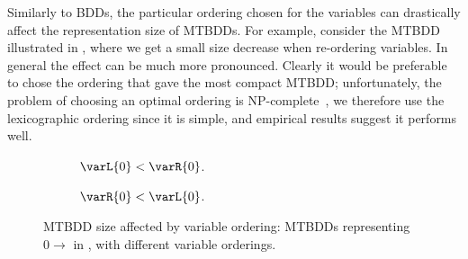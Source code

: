 Similarly to BDDs, the particular ordering chosen for the variables can
drastically affect the representation size of MTBDDs. For example, consider the
MTBDD illustrated in , where we get a small size
decrease when re-ordering variables. In general the effect can be much more
pronounced. Clearly it would be preferable to chose the ordering that gave the
most compact MTBDD; unfortunately, the problem of choosing an optimal ordering
is NP-complete~\cite{Bollig1996}, we therefore use the lexicographic ordering
since it is simple, and empirical results suggest it performs well.

\begin{figure}[ht]
    \begin{subfigure}[b]{0.5\textwidth}
        \centering
        \caption{$\varL{0} < \varR{0}$.}
    \end{subfigure}
    \begin{subfigure}[b]{0.5\textwidth}
        \centering
        \caption{$\varR{0} < \varL{0}$.}
    \end{subfigure}
    \newcommand{\capt}{MTBDD size affected by variable ordering}
    \caption[\capt]{\capt:
        MTBDDs representing $0 \rightarrow$ in , with
        different variable orderings.}
    \label{fig:MTBDDVarOrdering}
\end{figure}

